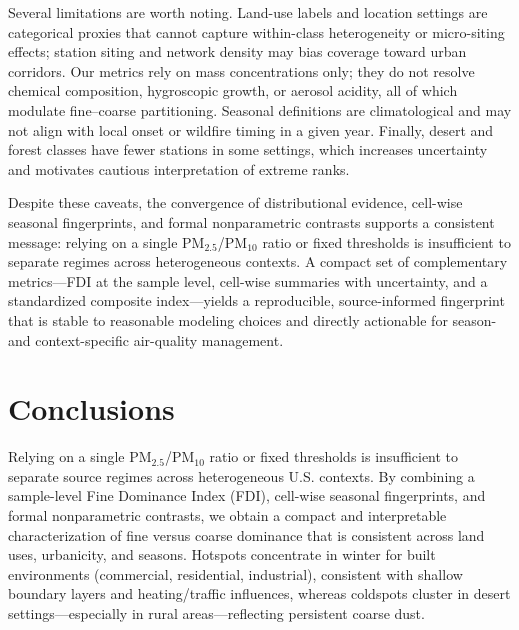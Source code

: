 \documentclass[a4paper,fleqn]{cas-sc}
\begin{document}
Several limitations are worth noting. Land-use labels and location settings are categorical proxies that cannot capture within-class heterogeneity or micro-siting effects; station siting and network density may bias coverage toward urban corridors. Our metrics rely on mass concentrations only; they do not resolve chemical composition, hygroscopic growth, or aerosol acidity, all of which modulate fine--coarse partitioning. Seasonal definitions are climatological and may not align with local onset or wildfire timing in a given year. Finally, desert and forest classes have fewer stations in some settings, which increases uncertainty and motivates cautious interpretation of extreme ranks.

Despite these caveats, the convergence of distributional evidence, cell-wise seasonal fingerprints, and formal nonparametric contrasts supports a consistent message: relying on a single PM$_{2.5}$/PM$_{10}$ ratio or fixed thresholds is insufficient to separate regimes across heterogeneous contexts. A compact set of complementary metrics—FDI at the sample level, cell-wise summaries with uncertainty, and a standardized composite index—yields a reproducible, source-informed fingerprint that is stable to reasonable modeling choices and directly actionable for season- and context-specific air-quality management.

















\section{Conclusions}

Relying on a single PM$_{2.5}$/PM$_{10}$ ratio or fixed thresholds is insufficient to separate source regimes across heterogeneous U.S. contexts. By combining a sample-level Fine Dominance Index (FDI), cell-wise seasonal fingerprints, and formal nonparametric contrasts, we obtain a compact and interpretable characterization of fine versus coarse dominance that is consistent across land uses, urbanicity, and seasons. Hotspots concentrate in winter for built environments (commercial, residential, industrial), consistent with shallow boundary layers and heating/traffic influences, whereas coldspots cluster in desert settings—especially in rural areas—reflecting persistent coarse dust.
\end{document}
